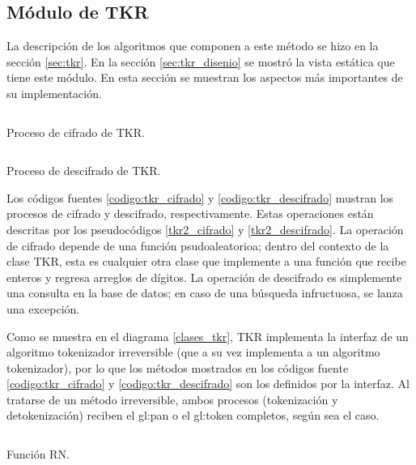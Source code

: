 %
%
%

\subsection{Módulo de TKR}

La descripción de los algoritmos que componen a este método se hizo en la
sección \ref{sec:tkr}. En la sección \ref{sec:tkr_disenio} se mostró la vista
estática que tiene este módulo. En esta sección se muestran los aspectos más
importantes de su implementación.

\begin{listing}
  \inputminted[firstline=41, lastline=69]
    {c++}{../implementaciones/tkr/tkr.cpp}
  \caption{Proceso de cifrado de TKR.}
  \label{codigo:tkr_cifrado}
\end{listing}

\begin{listing}
  \inputminted[firstline=71, lastline=86]
    {c++}{../implementaciones/tkr/tkr.cpp}
  \caption{Proceso de descifrado de TKR.}
  \label{codigo:tkr_descifrado}
\end{listing}

Los códigos fuentes \ref{codigo:tkr_cifrado} y \ref{codigo:tkr_descifrado}
mustran los procesos de cifrado y descifrado, respectivamente. Estas operaciones
están descritas por los pseudocódigos \ref{tkr2_cifrado} y
\ref{tkr2_descifrado}. La operación de cifrado depende de una función
psudoaleatorioa; dentro del contexto de la clase TKR, esta es cualquier
otra clase que implemente a una función que recibe enteros y regresa
arreglos de dígitos. La operación de descifrado es simplemente una consulta
en la base de datos; en caso de una búsqueda infructuosa, se lanza una
excepción.

Como se muestra en el diagrama \ref{clases_tkr}, TKR implementa la interfaz
de un algoritmo tokenizador irreversible (que a su vez implementa a un
algoritmo tokenizador), por lo que los métodos mostrados en los códigos
fuente \ref{codigo:tkr_cifrado} y \ref{codigo:tkr_descifrado} son
los definidos por la interfaz. Al tratarse de un método irreversible,
ambos procesos (tokenización y detokenización) reciben el \gls{gl:pan} o el
\gls{gl:token} completos, según sea el caso.

\begin{listing}
  \inputminted[firstline=53, lastline=75]
    {c++}{../implementaciones/tkr/funcion_rn.cpp}
  \caption{Función RN.}
  \label{codigo:funcion_rn}
\end{listing}

